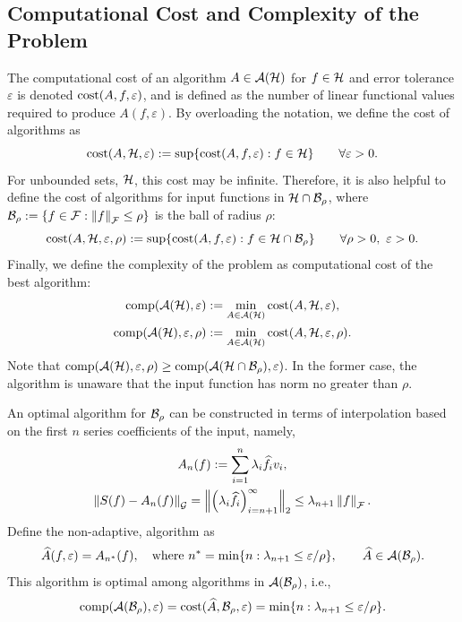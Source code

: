 \documentclass[final]{elsarticle}
\theoremstyle{definition}
\theoremstyle{remark}
\newcommand{\optAn}{A_n}
\begin{document}
\subsection{Computational Cost and Complexity of the Problem} The computational cost of an algorithm $A \in \ca(\ch)$ for $f \in \ch$ and error tolerance $\varepsilon$ is denoted $\cost(A,f,\varepsilon)$, and is defined as the number of linear functional values required to produce $A(f,\varepsilon)$.  By overloading the notation, we define the cost of algorithms as 
\begin{equation*}
\cost(A,\ch,\varepsilon) : = \sup \{\cost(A,f,\varepsilon) : f \in \ch \} \qquad \forall \varepsilon > 0.
\end{equation*}
For unbounded sets, $\ch$, this cost may be infinite.  Therefore, it is also helpful to define the cost of algorithms for input functions in $\ch \cap \cb_{\rho}$, where $\cb_{\rho} : = \{ f \in \cf : \norm[\cf]{f} \le \rho \}$ is the ball of radius $\rho$:
\begin{equation*}
\cost(A,\ch,\varepsilon,\rho) : = \sup \{\cost(A,f,\varepsilon) : f \in \ch \cap \cb_{\rho} \} \qquad \forall \rho > 0, \ \varepsilon > 0.
\end{equation*}
Finally, we define the complexity of the problem as computational cost of the best algorithm:
\begin{gather*}
\comp(\ca(\ch),\varepsilon) := \min_{A \in \ca(\ch)} \cost(A, \ch, \varepsilon), \\
\comp(\ca(\ch),\varepsilon,\rho) := \min_{A \in \ca(\ch)} \cost(A, \ch, \varepsilon, \rho).
\end{gather*}
Note that $\comp(\ca(\ch),\varepsilon,\rho) \ge \comp(\ca(\ch \cap \cb_{\rho}),\varepsilon)$.  In the former case, the algorithm is unaware  that the input function has norm no greater than $\rho$.  

An optimal algorithm for $\cb_{\rho}$ can be constructed in terms of interpolation based on the first $n$ series coefficients of the input, namely,
\begin{gather}  \label{optAdef}
\optAn(f) := \sum_{i=1}^n \lambda_{i} \hf_{i} v_{i}, \\
\label{errOpt}
\norm[\cg]{S(f) - \optAn(f)} = \Bignorm[2]{\left(\lambda_{i} \hf_{i} \right)_{i= n+1}^{\infty}} \le \lambda_{n+1} \norm[\cf]{f}.
\end{gather}
Define the non-adaptive, algorithm as
\begin{equation} \label{optBallalg}
\hA(f,\varepsilon) = A_{n^*}(f), \quad \text{where } n^* = \min\{ n : \lambda_{n+1} \le \varepsilon/\rho \}, \qquad \hA \in \ca(\cb_{\rho}).
\end{equation}
This algorithm is optimal among algorithms in $\ca(\cb_{\rho})$, i.e.,
\[
\comp(\ca(\cb_{\rho}),\varepsilon) = \cost(\hA,\cb_{\rho},\varepsilon) =
\min\{ n : \lambda_{n+1} \le \varepsilon/\rho \}.
\]
\end{document}
